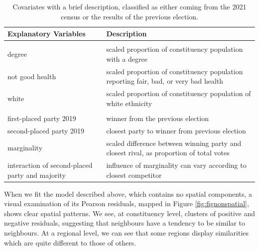 \documentclass[webpdf,large,contemporary,namedate]{oup-authoring-template}
\theoremstyle{thmstyleone}
\theoremstyle{thmstyletwo}
\theoremstyle{thmstylethree}
\begin{document}
\begin{table}

\caption{\label{tab:tabcovariates}Covariates with a brief description, classified as either coming from the 2021 census or the results of the previous election.}
\centering
\fontsize{8}{10}\selectfont
\begin{tabular}[t]{>{\raggedleft\arraybackslash}p{4cm}>{\raggedright\arraybackslash}p{12cm}}
\toprule
Explanatory Variables & Description\\
\midrule
\addlinespace[0.3em]
\hline
\multicolumn{2}{l}{\textbf{census 2021}}\\
\hspace{1em}degree & scaled proportion of constituency population with a degree\\
\hspace{1em}not good health & scaled proportion of constituency population reporting fair, bad, or very bad health\\
\hspace{1em}white & scaled proportion of constituency population of white ethnicity\\
\addlinespace[0.3em]
\hline
\multicolumn{2}{l}{\textbf{status quo ante}}\\
\hspace{1em}first-placed party 2019 & winner from the previous election\\
\hspace{1em}second-placed party 2019 & closest party to winner from previous election\\
\hspace{1em}marginality & scaled difference between winning party and closest rival, as proportion of total votes\\
\hspace{1em}interaction of second-placed party and majority & influence of marginality can vary according to closest competitor\\
\bottomrule
\end{tabular}
\end{table}

When we fit the model described above, which contains no spatial
components, a visual examination of its Pearson residuals, mapped in
Figure \ref{fig:fignonspatial}, shows clear spatial patterns. We see, at
constituency level, clusters of positive and negative residuals,
suggesting that neighbours have a tendency to be similar to neighbours.
At a regional level, we can see that some regions display similarities
which are quite different to those of others.
\end{document}

